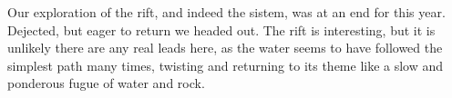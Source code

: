 Our exploration of the rift, and indeed the sistem, was at an end for this year. Dejected, but eager to return we headed out. The rift is interesting, but it is unlikely there are any real leads here, as the water seems to have followed the simplest path many times, twisting and returning to its theme like a slow and ponderous fugue of water and rock.
